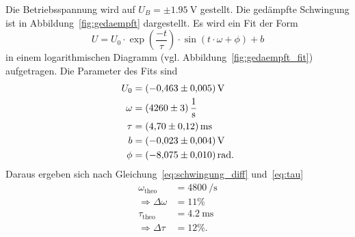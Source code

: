 Die Betriebsspannung wird auf $U_B = \pm \SI{1.95}{\volt}$ gestellt.
Die gedämpfte Schwingung ist in Abbildung~\ref{fig:gedaempft} dargestellt.
Es wird ein Fit der Form
\begin{equation}
U = U_0 \cdot \exp{\left(\frac{-t}{\tau}\right)} \cdot \sin{\left(t \cdot \omega  + \phi\right)} + b
\end{equation}
in einem logarithmischen Diagramm (vgl. Abbildung~\ref{fig:gedaempft_fit}) aufgetragen.
Die Parameter des Fits sind
\begin{align*}
  U_0 &= \SI{-0.463 \pm 0.005}{\volt} \\
  \omega &= \SI{4260 \pm 3}{\per\second} \\
  \tau &= \SI{4.7 \pm 0.12}{\milli\second} \\
  b &= \SI{-0.023 \pm 0.004}{\volt} \\
  \phi &= \SI{-8.075 \pm 0.01}{\radian}.
\end{align*}
Daraus ergeben sich nach Gleichung~\eqref{eq:schwingung_diff} und~\eqref{eq:tau}
\begin{align*}
  \omega_\text{theo} &= \SI{4800}{\per\second} \\
  \Rightarrow \Delta \omega &= \num{11}\% \\
  \tau_\text{theo} &= \SI{4.2}{\milli\second} \\
  \Rightarrow \Delta \tau &= \num{12}\%.
\end{align*}
